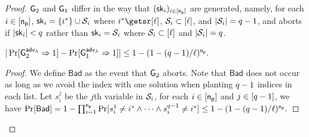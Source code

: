 \begin{proof}
 $\mathsf{G}_2$ and $\mathsf{G}_1$ differ in the way that $(\mathsf{sk}_i)_{i \in [\mathsf{n_p}]}$ are generated, namely,  for each $i \in [\mathsf{n_p}]$, $\mathsf{sk}_i = \{i^*\} \cup \mathcal{S}_i$ where $i^* \getsr [\listlength]$, $\mathcal{S}_i \subset [\ell]$, and $|\mathcal{S}_i| = q-1$, and aborts if $|\mathsf{sk}_i| < q$ rather than $\mathsf{sk}_i = \mathcal{S}_i$ where $\mathcal{S}_i \subset [\ell]$ and $|\mathcal{S}_i| = q$.
\begin{lemma}
\label{lem:timenike-1}
$
|\Pr[\mathsf{G}_2^{{\mathsf{adv}}_\lambda}\Rightarrow 1]-\Pr[\mathsf{G}_1^{{\mathsf{adv}}_\lambda}\Rightarrow 1]| \leq 1-(1-({q-1})/{\ell})^{\mathsf{n_p}}.
$
\end{lemma}
\begin{proof}
We define $\mathsf{Bad}$ as the event that $\mathsf{G}_2$ aborts. Note that $\mathsf{Bad}$ does not occur as long as we avoid the index with one solution when planting $q-1$ indices in each list. Let $s^j_{i}$ be the $j$th variable in $\mathcal{S}_{i}$, for each $i \in [\mathsf{n_p}]$ and $j \in [q-1]$, we have
$
\Pr[\mathsf{Bad}]=1- \prod_{i=1}^{\mathsf{n_p}}\Pr[s_{i}^1 \neq i^* \land \cdots \land s_{i}^{q-1} \neq i^*] \leq 1-(1-({q-1})/{\ell})^{\mathsf{n_p}}.
$


%


\end{proof}
\end{proof}
